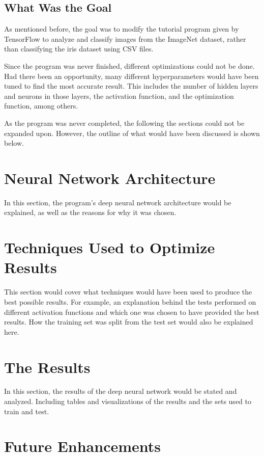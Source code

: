 \documentclass{article}
\begin{document}
\subsection{What Was the Goal}

As mentioned before, the goal was to modify the tutorial program
given by TensorFlow to analyze and classify images from the ImageNet
dataset, rather than classifying the iris dataset using CSV files.

Since the program was never finished, different optimizations could
not be done. Had there been an opportunity, many different hyperparameters
would have been tuned to find the most accurate result. This includes the
number of hidden layers and neurons in those layers, the activation function,
and the optimization function, among others.

As the program was never completed, the following the sections could not be
expanded upon. However, the outline of what would have been
discussed is shown below.

\section{Neural Network Architecture}

In this section, the program's deep neural network architecture would
be explained, as well as the reasons for why it was chosen.

\section{Techniques Used to Optimize Results}

This section would cover what techniques would have been used
to produce the best possible results. For example, an explanation
behind the tests performed on different activation functions and
which one was chosen to have provided the best results. How the
training set was split from the test set would also be explained here.

\section{The Results}

In this section, the results of the deep neural network would
be stated and analyzed. Including tables and visualizations of
the results and the sets used to train and test.

\section{Future Enhancements}
\end{document}
